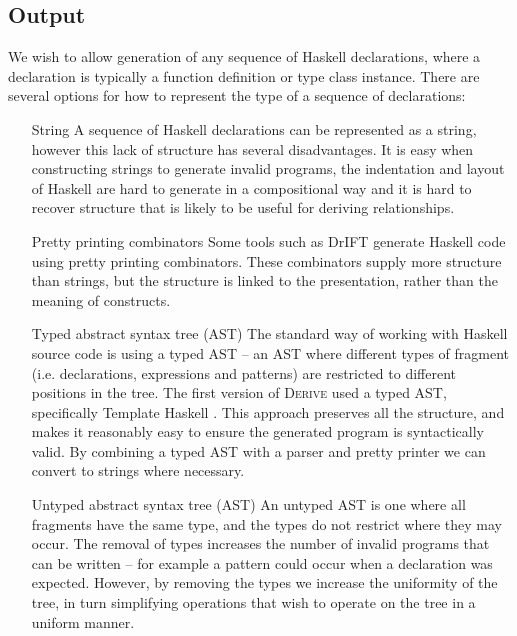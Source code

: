 \documentclass[preprint]{sigplanconf}
\newcommand{\derive}{\textsc{Derive}}
\begin{document}
\subsection{Output}

We wish to allow generation of any sequence of Haskell declarations, where a declaration is typically a function definition or type class instance. There are several options for how to represent the type of a sequence of declarations:

\begin{itemize}
\item[String] A sequence of Haskell declarations can be represented as a string, however this lack of structure has several disadvantages. It is easy when constructing strings to generate invalid programs, the indentation and layout of Haskell are hard to generate in a compositional way and it is hard to recover structure that is likely to be useful for deriving relationships.
\item[Pretty printing combinators] Some tools such as DrIFT \cite{drift} generate Haskell code using pretty printing combinators. These combinators supply more structure than strings, but the structure is linked to the presentation, rather than the meaning of constructs.
\item[Typed abstract syntax tree (AST)] The standard way of working with Haskell source code is using a typed AST -- an AST where different types of fragment (i.e. declarations, expressions and patterns) are restricted to different positions in the tree. The first version of \derive{} used a typed AST, specifically Template Haskell \cite{template_haskell}. This approach preserves all the structure, and makes it reasonably easy to ensure the generated program is syntactically valid. By combining a typed AST with a parser and pretty printer we can convert to strings where necessary.
\item[Untyped abstract syntax tree (AST)] An untyped AST is one where all fragments have the same type, and the types do not restrict where they may occur. The removal of types increases the number of invalid programs that can be written -- for example a pattern could occur when a declaration was expected. However, by removing the types we increase the uniformity of the tree, in turn simplifying operations that wish to operate on the tree in a uniform manner.
\end{itemize}
\end{document}
